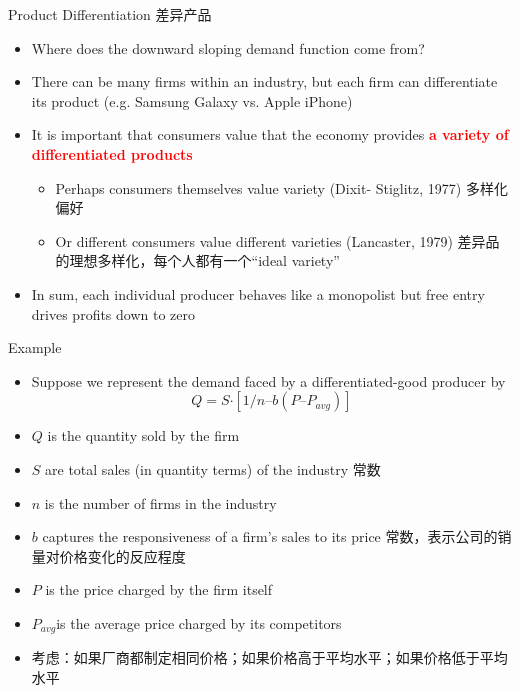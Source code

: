 \documentclass[10pt,hyperref={CJKbookmarks=true},xcolor=dvipsnames,aspectratio=169]{beamer}
\begin{document}
\begin{frame}{Product Differentiation 差异产品}

\begin{itemize}
\item Where does the downward sloping demand function come from? 
\item There can be many firms within an industry, but each firm can differentiate
its product (e.g. Samsung Galaxy vs. Apple iPhone) 
\item It is important that consumers value that the economy provides \textbf{\textcolor{red}{a
variety of differentiated products }}

\begin{itemize}
\item Perhaps consumers themselves value variety (Dixit- Stiglitz, 1977)
多样化偏好
\item Or different consumers value different varieties (Lancaster, 1979)
差异品的理想多样化，每个人都有一个“ideal variety”
\end{itemize}
\item In sum, each individual producer behaves like a monopolist but free
entry drives profits down to zero 
\end{itemize}
\end{frame}

\begin{frame}{Example}

\begin{itemize}
\item Suppose we represent the demand faced by a differentiated-good producer
by
\[
Q=S\text{·}[1/n\text{–}b(P\text{–}P_{avg})]
\]

\item $Q$ is the quantity sold by the firm 
\item $S$ are total sales (in quantity terms) of the industry 常数 
\item $n$ is the number of firms in the industry 
\item $b$ captures the responsiveness of a firm’s sales to its price 常数，表示公司的销量对价格变化的反应程度
\item $P$ is the price charged by the firm itself 
\item $P_{avg}$is the average price charged by its competitors 
\item 考虑：如果厂商都制定相同价格；如果价格高于平均水平；如果价格低于平均水平
\end{itemize}
\end{frame}
\end{document}
